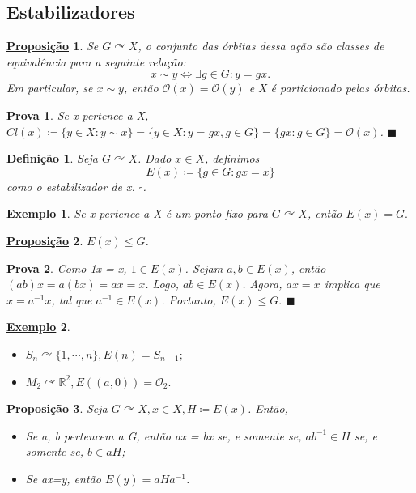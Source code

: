 \documentclass{article}
\newtheorem*{def*}{\underline{Defini\c c\~ao}}
\newtheorem*{prop*}{\underline{Proposi\c c\~ao}}
\newtheorem{example*}{\underline{Exemplo}}
\newtheorem*{proof*}{\underline{Prova}}
\renewcommand\qedsymbol{$\blacksquare$}
\begin{document}
\subsection{Estabilizadores}
\begin{prop*}
  Se \(G \curvearrowright X\), o conjunto das órbitas dessa a\c cão são classes de equivalência para a seguinte rela\c cão: 
    \[
      x\sim y \Longleftrightarrow \exists g\in G: y = gx.
    \]
    Em particular, se \(x\sim y\), então \(\mathcal{O}(x) = \mathcal{O}(y)\) e X é particionado pelas órbitas.
\end{prop*}
\begin{proof*}
  Se x pertence a X, \(Cl(x)\coloneqq \{y\in X: y\sim x\} = \{y\in X: y=gx, g\in G\} = \{gx: g\in G\}= \mathcal{O}(x)\). \qedsymbol
\end{proof*}
\begin{def*}
  Seja \(G \curvearrowright X\). Dado \(x\in X\), definimos 
    \[
      E(x)\coloneqq \{g\in G: gx = x\}
    \]
    como o estabilizador de x. \(\square\).
\end{def*}
\begin{example*}
  Se x pertence a X é um ponto fixo para \(G \curvearrowright X\), então \(E(x) = G.\)
\end{example*}
\begin{prop*}
  \(E(x)\leq G\).
\end{prop*}
\begin{proof*}
  Como 1x = x, \(1\in E(x)\). Sejam \(a, b\in E(x)\), então \((ab)x = a(bx) = ax = x\). Logo, \(ab\in E(x)\). Agora, \(ax = x \) implica que \( x = a^{-1}x \),
  tal que \(a^{-1}\in E(x)\). Portanto, \(E(x)\leq G.\) \qedsymbol
\end{proof*}
\begin{example*}
 \begin{itemize}
   \item[1)] \(S_{n} \curvearrowright \{1, \cdots, n\}, E(n) = S_{n-1};\)
     \item[2)] \(M_{2} \curvearrowright \mathbb{R}^{2}, E((a, 0)) = \mathcal{O}_{2}.\)
 \end{itemize}
\end{example*}
\begin{prop*}
  Seja \(G \curvearrowright X, x\in X, H\coloneqq E(x)\). Então, 
 \begin{itemize}
   \item[i)] Se a, b pertencem a G, então ax = bx se, e somente se, \(ab^{-1}\in H\) se, e somente se, \(b\in aH\);
     \item[ii)] Se ax=y, então \(E(y) = aHa^{-1}\).
 \end{itemize}
\end{prop*}
\end{document}
